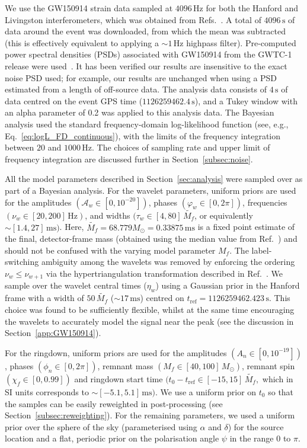 We use the GW150914 strain data sampled at $4096\, \mathrm{Hz}$ for both the Hanford and Livingston interferometers, which was obtained from Refs.~\cite{gwosc, LIGOScientific:2019lzm}.
A total of $4096\,\mathrm{s}$ of data around the event was downloaded, from which the mean was subtracted (this is effectively equivalent to applying a $\sim 1\, \mathrm{Hz}$ highpass filter). 
Pre-computed power spectral densities (PSDs) associated with GW150914 from the GWTC-1 release were used~\cite{gwtc1psds}. 
It has been verified our results are insensitive to the exact noise PSD used; for example, our results are unchanged when using a PSD estimated from a length of off-source data.
The analysis data consists of $4\,\mathrm{s}$ of data centred on the event GPS time ($1126259462.4\,\mathrm{s}$), and a Tukey window with an alpha parameter of 0.2 was applied to this analysis data.
The Bayesian analysis used the standard frequency-domain log-likelihood function (see, e.g., Eq.~\ref{eq:logL_FD_continuous}), with the limits of the frequency integration between $20$ and $1000\, \mathrm{Hz}$.
The choices of sampling rate and upper limit of frequency integration are discussed further in Section~\ref{subsec:noise}.

All the model parameters described in Section~\ref{sec:analysis} were sampled over as part of a Bayesian analysis.
For the wavelet parameters, uniform priors are used for the amplitudes $(\mathcal{A}_w \in [0,10^{-20}])$, phases $(\varphi_w \in [0,2\pi])$, frequencies $(\nu_w \in [20,200]\, \mathrm{Hz})$, and widths $(\tau_w \in [4,80]\, \tilde{M_f}$, or equivalently $\sim[1.4,27]\, \mathrm{ms})$.
Here, $\tilde{M_f}=68.779M_\odot=0.33875\,\mathrm{ms}$ is a fixed point estimate of the final, detector-frame mass (obtained using the median value from Ref.~\cite{LIGOScientific:2018mvr}) and should not be confused with the varying model parameter $M_f$.
The label-switching ambiguity among the wavelets was removed by enforcing the ordering 
$ \nu_w \leq \nu_{w+1} $ via the hypertriangulation transformation described in Ref.~\cite{Buscicchio:2019rir}.
We sample over the wavelet central times ($\eta_w$) using a Gaussian prior in the Hanford frame with a width of $50\,\tilde{M_f}$ ($\sim 17\,\mathrm{ms}$) centred on $t_\mathrm{ref} = 1126259462.423\,\mathrm{s}$.
This choice was found to be sufficiently flexible, whilst at the same time encouraging the wavelets to accurately model the signal near the peak (see the discussion in Section~\ref{app:GW150914}).

For the ringdown, uniform priors are used for the amplitudes $(A_n \in [0,10^{-19}])$, phases $(\phi_n \in [0,2\pi])$, remnant mass $(M_f \in [40,100]\,M_\odot )$, remnant spin $(\chi_f \in [0,0.99])$ and ringdown start time $(t_0-t_\mathrm{ref} \in [-15, 15]\,\tilde{M_f},$ which in SI units corresponds to $\sim[-5.1,5.1]\, \mathrm{ms})$.
We use a uniform prior on $t_0$ so that the samples can be easily reweighted in post-processing (see Section~\ref{subsec:reweighting}). 
For the remaining parameters, we used a uniform prior over the sphere of the sky (parameterised using $\alpha$ and $\delta$) for the source location and a flat, periodic prior on the polarisation angle $\psi$ in the range $0$ to $\pi$.

